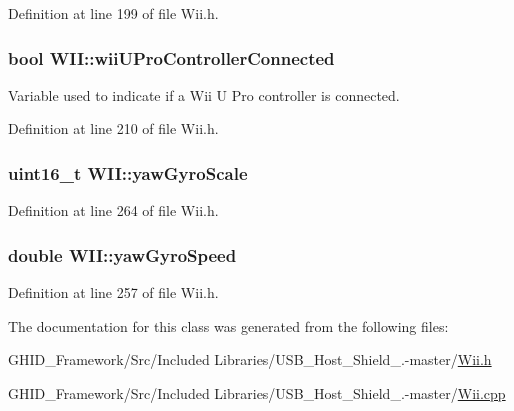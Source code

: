 \-Definition at line 199 of file \-Wii.\-h.

\hypertarget{class_w_i_i_a461f5b7a5f2bc874e107fc776c284b16}{
\subsubsection[{wii\-U\-Pro\-Controller\-Connected}]{\setlength{\rightskip}{0pt plus 5cm}bool {\bf \-W\-I\-I\-::wii\-U\-Pro\-Controller\-Connected}}}\label{class_w_i_i_a461f5b7a5f2bc874e107fc776c284b16}
\-Variable used to indicate if a \-Wii \-U \-Pro controller is connected. 

\-Definition at line 210 of file \-Wii.\-h.

\hypertarget{class_w_i_i_a0694969a30092b9b1dcb26120c7cff73}{
\subsubsection[{yaw\-Gyro\-Scale}]{\setlength{\rightskip}{0pt plus 5cm}uint16\-\_\-t {\bf \-W\-I\-I\-::yaw\-Gyro\-Scale}}}\label{class_w_i_i_a0694969a30092b9b1dcb26120c7cff73}


\-Definition at line 264 of file \-Wii.\-h.

\hypertarget{class_w_i_i_ad5df436cc5d073f26bf3ea5c60d788d6}{
\subsubsection[{yaw\-Gyro\-Speed}]{\setlength{\rightskip}{0pt plus 5cm}double {\bf \-W\-I\-I\-::yaw\-Gyro\-Speed}}}\label{class_w_i_i_ad5df436cc5d073f26bf3ea5c60d788d6}


\-Definition at line 257 of file \-Wii.\-h.



\-The documentation for this class was generated from the following files\-:\begin{DoxyCompactItemize}
\item 
\-G\-H\-I\-D\-\_\-\-Framework/\-Src/\-Included Libraries/\-U\-S\-B\-\_\-\-Host\-\_\-\-Shield\-\_.-\/master/\hyperlink{_wii_8h}{\-Wii.\-h}\item 
\-G\-H\-I\-D\-\_\-\-Framework/\-Src/\-Included Libraries/\-U\-S\-B\-\_\-\-Host\-\_\-\-Shield\-\_.-\/master/\hyperlink{_wii_8cpp}{\-Wii.\-cpp}\end{DoxyCompactItemize}
